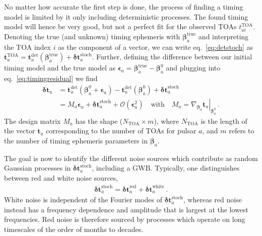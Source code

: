 No matter how accurate the first step is done, the process of finding a timing model is limited by it only including deterministic processes.  The found timing model will hence be very good, but not a perfect fit for the observed \acp{TOA} $t_{ai}^{\text{TOA}}$. Denoting the true (and unknown) timing ephemeris with $\bm{\beta}_a^\text{true}$ and interpreting the \ac{TOA} index $i$ as the component of a vector, we can write eq.~\eqref{eq:detstoch} as $\bm{t}_{a}^{\text{TOA}} = \bm{t}_{a}^{\text{det}}(\bm{\beta}_a^\text{true}) + \bm{\delta  t}_{a}^\text{stoch}$. Further, defining the difference between our initial timing model and the true model as $\bm{\epsilon}_a = \bm{\beta}_a^\text{true} - \bm{\beta}_a^0$ and plugging into eq.~\eqref{eq:timingresidual} we find
\begin{align}
	 \bm{\delta t}_{a} &= \bm{t}_a^\text{det} (\bm{\beta}_a^0 +   \bm{\epsilon}_a) - \bm{t}_a^\text{det} (\bm{\beta}_a^0) +\bm{\delta t}_{a}^\text{stoch} \nonumber \\
	&= M_a \bm{\epsilon}_a +\bm{\delta  t}_{a}^\text{stoch}  + \mathcal{O}(\bm{\epsilon}^2_a) \quad \text{with} \quad M_a = \left. \nabla_{\bm{\beta}_a} \bm{t}_a \right|_{\bm{\beta}_a^0} \, .
\end{align}
The design matrix $M_a$ has the shape ($N_\text{TOA} \times m$), where $N_\text{TOA}$ is the length of the vector $\bm{t}_{a}$ corresponding to the number of \acp{TOA} for pulsar $a$, and $m$ refers to the number of timing ephemeris parameters in $\bm{\beta}_a$.

The goal is now to identify  the different noise sources which contribute as random Gaussian processes in $\bm{\delta t}_{a}^\text{stoch}$, including a \ac{GWB}. Typically, one distinguishes between red and white noise sources,
\begin{align}
	\bm{\delta t}_{a}^\text{stoch} = \bm{\delta t}_{a}^\text{red} + \bm{\delta t}_{a}^\text{white} \, .
\end{align}
White noise is independent of the Fourier modes of $\bm{\delta t}_{a}^\text{stoch}$, whereas red noise instead has a frequency dependence and amplitude that is largest at the lowest frequencies. Red noise is therefore sourced by processes which operate on long timescales of the order of months to decades.

